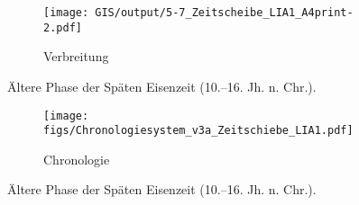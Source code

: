\begin{figure*}[p]
	\centering
	\begin{subfigure}[b]{\textwidth}
		\centering
		\texttt{[image: GIS/output/5-7\_Zeitscheibe\_LIA1\_A4print-2.pdf]}
		\vspace{2cm}
		\caption{Verbreitung}
		\label{fig:LIA1_Karte}
	\end{subfigure}
	\caption{Ältere Phase der Späten Eisenzeit (10.--16. Jh. n. Chr.).}
	\label{}
\end{figure*}
\addtocounter{figure}{-1}
\begin{figure*}[p]
	\begin{subfigure}[b]{\textwidth}
		\setcounter{subfigure}{1}
		\centering
		\texttt{[image: figs/Chronologiesystem\_v3a\_Zeitschiebe\_LIA1.pdf]}
		\caption{Chronologie}
		\label{fig:LIA1_Chronologie}
	\end{subfigure}
	\caption{Ältere Phase der Späten Eisenzeit (10.--16. Jh. n. Chr.).}
	\label{fig:LIA1}
\end{figure*}

